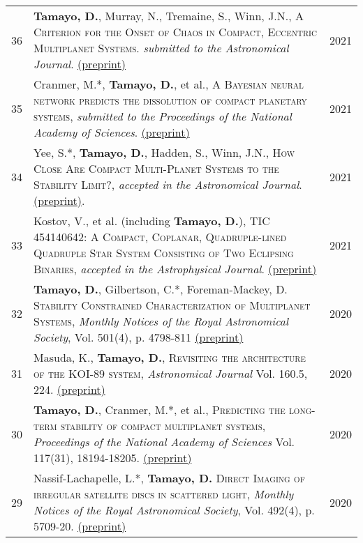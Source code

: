 \documentclass[10pt]{article} %
\begin{document}
\begin{tabular}{>{\hfill}r|p{14.3cm}l}

36 & {\bf Tamayo, D.}, Murray, N., Tremaine, S., Winn, J.N., \textsc{A Criterion for the Onset of Chaos in Compact, Eccentric Multiplanet Systems}. {\it submitted to the Astronomical Journal}. \href{https://arxiv.org/pdf/2106.14863}{(preprint)} & 2021 \\

35 & Cranmer, M.*, {\bf Tamayo, D.}, et al., \textsc{A Bayesian neural network predicts the dissolution of compact planetary systems}, {\it submitted to the Proceedings of the National Academy of Sciences}. \href{https://arxiv.org/pdf/2101.04117}{(preprint)}& 2021 \\

34 & Yee, S.*, {\bf Tamayo, D.}, Hadden, S., Winn, J.N., \textsc{How Close Are Compact Multi-Planet Systems to the Stability Limit?}, {\it accepted in the Astronomical Journal}. \href{https://arxiv.org/pdf/2105.06338.pdf}{(preprint)}. & 2021 \\

33 & Kostov, V., et al. (including {\bf Tamayo, D.}), \textsc{TIC 454140642: A Compact, Coplanar, Quadruple-lined Quadruple Star System Consisting of Two Eclipsing Binaries}, {\it accepted in the Astrophysical Journal}. \href{https://arxiv.org/pdf/2105.12586.pdf}{(preprint)} & 2021 \\

32 & {\bf Tamayo, D.}, Gilbertson, C.*, Foreman-Mackey, D. \textsc{Stability Constrained Characterization of Multiplanet Systems}, {\it Monthly Notices of the Royal Astronomical Society}, Vol. 501(4), p. 4798-811 \href{https://arxiv.org/abs/2009.11831}{(preprint)}& 2020 \\

31 & Masuda, K., {\bf Tamayo, D.}, \textsc{Revisiting the architecture of the KOI-89 system}, {\it Astronomical Journal} Vol. 160.5, 224. \href{https://arxiv.org/abs/2009.06850}{(preprint)}& 2020 \\

30 & {\bf Tamayo, D.}, Cranmer, M.*, et al., \textsc{Predicting the long-term stability of compact multiplanet systems}, {\it Proceedings of the National Academy of Sciences} Vol. 117(31), 18194-18205. \href{https://arxiv.org/abs/2007.06521}{(preprint)}& 2020 \\

29 & Nassif-Lachapelle, L.*, {\bf Tamayo, D.} \textsc{Direct Imaging of irregular satellite discs in scattered light}, {\it Monthly Notices of the Royal Astronomical Society}, Vol. 492(4), p. 5709-20. \href{https://arxiv.org/abs/1910.09377}{(preprint)}& 2020 \\


\end{tabular}
\end{document}
